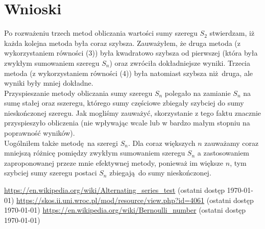 \documentclass{article}
\begin{document}
\section{Wnioski}
\indent\hspace{4mm} Po rozważeniu trzech metod obliczania wartości sumy szeregu $S_2$ stwierdzam, iż każda kolejna metoda była coraz szybsza. Zauważyłem, że druga metoda (z wykorzystaniem równości (3))
była kwadratowo szybsza od pierwszej (która była zwykłym sumowaniem szeregu $S_n$) oraz zwróciła dokładniejsze wyniki. Trzecia metoda (z wykorzystaniem równości (4))
była natomiast szybsza niż druga, ale wyniki były mniej dokładne.\\
\indent Przyspieszanie metody obliczania sumy szeregu $S_n$ polegało na zamianie $S_n$ na sumę stałej oraz sszeregu, którego sumy częściowe zbiegały szybciej do sumy nieskończonej szeregu. Jak mogliśmy zauważyć, skorzystanie z tego faktu znacznie przyspieszyło obliczenia (nie wpływając wcale lub w bardzo małym stopniu na poprawność wyników). \\
\indent Uogólniłem także metodę na szeregi $S_n$. Dla coraz większych $n$ zauważamy coraz mniejszą różnicę pomiędzy zwykłym sumowaniem szeregu $S_n$ a zastosowaniem zaproponowanej przeze mnie efektywnej metody, ponieważ im większe $n$, tym szybciej sumy szeregu postaci $S_n$ zbiegają do sumy nieskończonej.


\begin{thebibliography}{3}
	\itemsep2pt
	
	 \url{https://en.wikipedia.org/wiki/Alternating_series_test}
	(ostatni dostęp \today)
	 \url{https://skos.ii.uni.wroc.pl/mod/resource/view.php?id=4061}
	(ostatni dostęp \today)
	 \url{https://en.wikipedia.org/wiki/Bernoulli_number}
	(ostatni dostęp \today)

\end{thebibliography}
\end{document}
